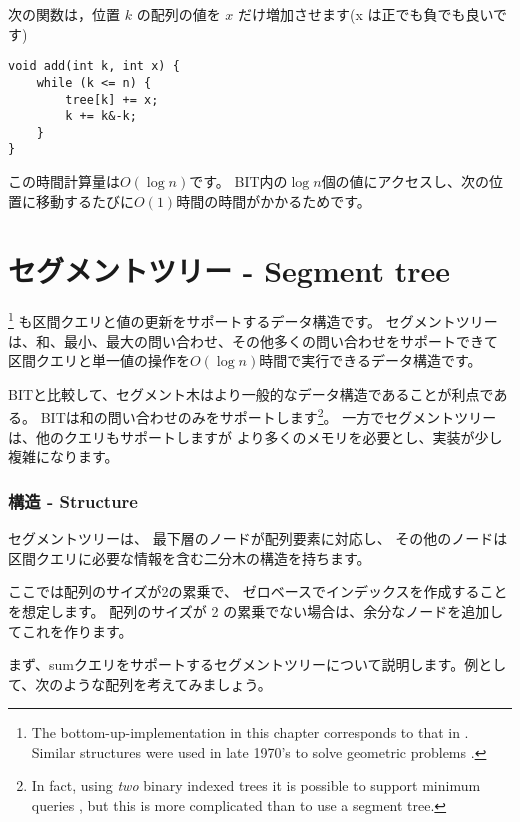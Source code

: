 次の関数は，位置 $k$ の配列の値を $x$ だけ増加させます(x は正でも負でも良いです)
\begin{lstlisting}
void add(int k, int x) {
    while (k <= n) {
        tree[k] += x;
        k += k&-k;
    }
}
\end{lstlisting}

この時間計算量は$O(\log n)$です。
BIT内の$\log n$個の値にアクセスし、次の位置に移動するたびに$O(1)$時間の時間がかかるためです。

\section{セグメントツリー - Segment tree}


\footnote{The bottom-up-implementation in this chapter corresponds to
that in \cite{sta06}. Similar structures were used
in late 1970's to solve geometric problems \cite{ben80}.}
も区間クエリと値の更新をサポートするデータ構造です。
セグメントツリーは、和、最小、最大の問い合わせ、その他多くの問い合わせをサポートできて
区間クエリと単一値の操作を$O(\log n)$時間で実行できるデータ構造です。

BITと比較して、セグメント木はより一般的なデータ構造であることが利点である。
BITは和の問い合わせのみをサポートします\footnote{In fact, using \emph{two} binary
indexed trees it is possible to support minimum queries \cite{dim15},
but this is more complicated than to use a segment tree.}。
一方でセグメントツリーは、他のクエリもサポートしますが
より多くのメモリを必要とし、実装が少し複雑になります。

\subsubsection{構造 - Structure}

セグメントツリーは、
最下層のノードが配列要素に対応し、
その他のノードは区間クエリに必要な情報を含む二分木の構造を持ちます。

ここでは配列のサイズが2の累乗で、
ゼロベースでインデックスを作成することを想定します。
配列のサイズが 2 の累乗でない場合は、余分なノードを追加してこれを作ります。

まず、sumクエリをサポートするセグメントツリーについて説明します。例として、次のような配列を考えてみましょう。

